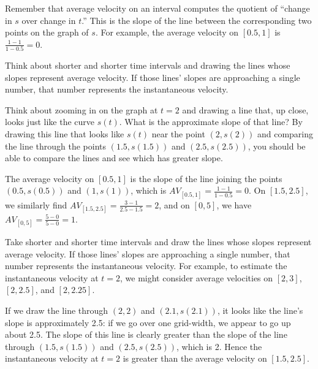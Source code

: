 \begin{bighint}
\ba
	\item Remember that average velocity on an interval computes the quotient of ``change in $s$ over change in $t$.''  This is the slope of the line between the corresponding two points on the graph of $s$.  For example, the average velocity on $[0.5,1]$ is $\frac{1-1}{1-0.5} = 0$.
	\item Think about shorter and shorter time intervals and drawing the lines whose slopes represent average velocity.  If those lines' slopes are approaching a single number, that number represents the instantaneous velocity.
	\item Think about zooming in on the graph at $t = 2$ and drawing a line that, up close, looks just like the curve $s(t)$.  What is the approximate slope of that line?  By drawing this line that looks like $s(t)$ near the point $(2,s(2))$ and comparing the line through the points $(1.5,s(1.5))$ and $(2.5, s(2.5))$, you should be able to compare the lines and see which has greater slope.
\ea
\end{bighint}
\begin{activitySolution}
\ba
	\item The average velocity on $[0.5,1]$ is the slope of the line joining the points $(0.5,s(0.5))$ and $(1,s(1))$, which is $AV_{[0.5,1]} = \frac{1-1}{1-0.5} = 0$.  On $[1.5,2.5]$, we similarly find $AV_{[1.5,2.5]} = \frac{3-1}{2.5-1.5} = 2$, and on $[0,5]$, we have $AV_{[0,5]} = \frac{5-0}{5-0} = 1$.
	\item  Take shorter and shorter time intervals and draw the lines whose slopes represent average velocity.  If those lines' slopes are approaching a single number, that number represents the instantaneous velocity.  For example, to estimate the instantaneous velocity at $t = 2$, we might consider average velocities on $[2,3]$, $[2,2.5]$, and $[2,2.25]$.
	\item  If we draw the line through $(2,2)$ and $(2.1,s(2.1))$, it looks like the line's slope is approximately 2.5: if we go over one grid-width, we appear to go up about 2.5.  The slope of this line is clearly greater than the slope of the line through $(1.5, s(1.5))$ and $(2.5, s(2.5))$, which is 2. Hence the instantaneous velocity at $t = 2$ is greater than the average velocity on $[1.5,2.5]$.
\ea
\end{activitySolution}
\aftera
